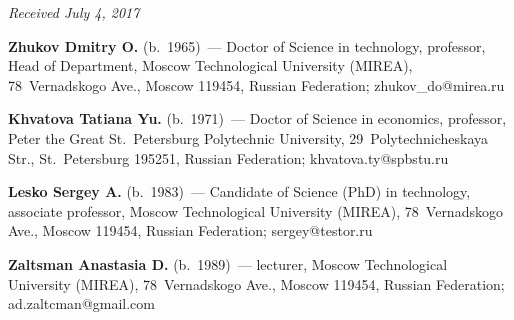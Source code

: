 \hfill{\small\textit{Received July 4, 2017}}




\Contr

\noindent
\textbf{Zhukov Dmitry O.} (b.\ 1965)~--- Doctor of Science in technology, 
professor, Head of Department, Moscow Technological University (MIREA), 
78~Vernadskogo Ave., Moscow 119454, Russian Federation; 
\mbox{zhukov\_do@mirea.ru}

\vspace*{6pt}

\noindent
\textbf{Khvatova Tatiana Yu.} (b.\ 1971)~---  Doctor of Science in economics, 
professor, Peter the Great St.\ Petersburg Polytechnic University, 
29~Polytechnicheskaya Str., St.\ Petersburg 195251, Russian Federation; 
\mbox{khvatova.ty@spbstu.ru}

\vspace*{6pt}

\noindent
\textbf{Lesko Sergey A.} (b.\ 1983)~--- Candidate of Science (PhD) in technology, 
associate professor, Moscow Technological University (MIREA), 78~Vernadskogo 
Ave., Moscow 119454, Russian Federation; \mbox{sergey@testor.ru}

\vspace*{6pt}

\noindent
\textbf{Zaltsman Anastasia D.} (b.\ 1989)~--- lecturer, 
Moscow Technological University (MIREA), 78~Vernadskogo Ave., Moscow 119454, Russian 
Federation; \mbox{ad.zaltcman@gmail.com} 

\label{end\stat}


\renewcommand{\bibname}{\protect\rm Литература} 